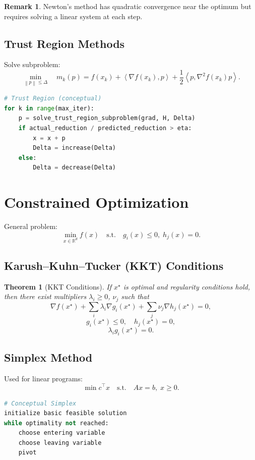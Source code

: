 \documentclass[12pt,oneside]{book}
\numberwithin{equation}{section}
\theoremstyle{definition}
\newtheorem{remark}{Remark}[section]
\theoremstyle{plain}
\newtheorem{theorem}{Theorem}[section]
\theoremstyle{remark}
\newcommand{\R}{\mathbb{R}}
\newcommand{\norm}[1]{\left\lVert #1 \right\rVert}
\newcommand{\inner}[2]{\left\langle #1, #2 \right\rangle}
\newcommand{\grad}{\nabla}
\newcommand{\Hess}{\nabla^2}
\begin{document}
\begin{remark}
Newton's method has quadratic convergence near the optimum but requires solving a linear system at each step.
\end{remark}

\subsection{Trust Region Methods}

Solve subproblem:
\[
\min_{\norm{p} \leq \Delta} \quad m_k(p) = f(x_k) + \inner{\grad f(x_k)}{p} + \frac{1}{2} \inner{p}{\Hess f(x_k)p}.
\]

\begin{lstlisting}[language=Python]
# Trust Region (conceptual)
for k in range(max_iter):
    p = solve_trust_region_subproblem(grad, H, Delta)
    if actual_reduction / predicted_reduction > eta:
        x = x + p
        Delta = increase(Delta)
    else:
        Delta = decrease(Delta)
\end{lstlisting}

\section{Constrained Optimization}

General problem:
\[
\min_{x \in \R^d} f(x) \quad \text{s.t.} \quad g_i(x) \leq 0, \; h_j(x) = 0.
\]

\subsection{Karush--Kuhn--Tucker (KKT) Conditions}

\begin{theorem}[KKT Conditions]
If $x^\star$ is optimal and regularity conditions hold, then there exist multipliers $\lambda_i \geq 0$, $\nu_j$ such that
\[
\grad f(x^\star) + \sum_i \lambda_i \grad g_i(x^\star) + \sum_j \nu_j \grad h_j(x^\star) = 0,
\]
\[
g_i(x^\star) \leq 0, \quad h_j(x^\star) = 0,
\]
\[
\lambda_i g_i(x^\star) = 0.
\]
\end{theorem}

\subsection{Simplex Method}

Used for linear programs:
\[
\min c^\top x \quad \text{s.t.} \quad Ax = b, \; x \geq 0.
\]

\begin{lstlisting}[language=Python]
# Conceptual Simplex
initialize basic feasible solution
while optimality not reached:
    choose entering variable
    choose leaving variable
    pivot
\end{lstlisting}
\end{document}
